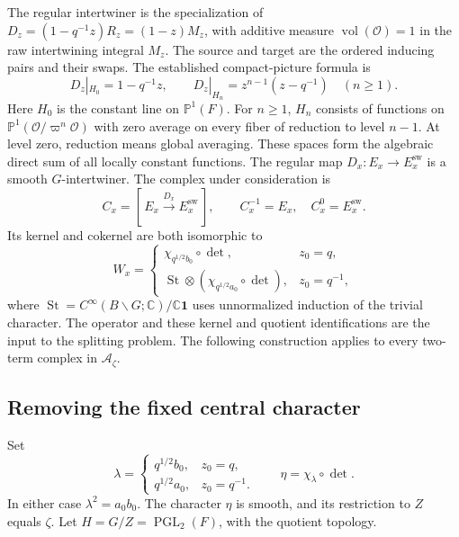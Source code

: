 The regular intertwiner is the specialization of
$D_z=(1-q^{-1}z)R_z=(1-z)M_z$, with additive measure
$\operatorname{vol}(\mathcal O)=1$ in the raw intertwining integral $M_z$.
The source and target are the ordered inducing pairs and their swaps.
The established compact-picture formula is
\[
 D_z|_{H_0}=1-q^{-1}z,\qquad
 D_z|_{H_n}=z^{n-1}(z-q^{-1})\quad(n\ge1).
\]
Here $H_0$ is the constant line on $\mathbb P^1(F)$.
For $n\ge1$, $H_n$ consists of functions on
$\mathbb P^1(\mathcal O/\varpi^n\mathcal O)$ with zero average on every fiber of reduction to level $n-1$.
At level zero, reduction means global averaging.
These spaces form the algebraic direct sum of all locally constant functions.
The regular map $D_x:E_x\to E_x^{\mathrm{sw}}$ is a smooth $G$-intertwiner.
The complex under consideration is
\begin{equation}\label{v4-arith:w10-d:fixed-center:eq:cone}
 C_x=[\,E_x\xrightarrow{D_x}E_x^{\mathrm{sw}}\,],
 \qquad C_x^{-1}=E_x,\quad C_x^0=E_x^{\mathrm{sw}}.
\end{equation}
Its kernel and cokernel are both isomorphic to
\begin{equation}\label{v4-arith:w10-d:fixed-center:eq:W}
 W_x=\begin{cases}
 \chi_{q^{1/2}b_0}\circ\det,&z_0=q,\\
 \operatorname{St}\otimes(\chi_{q^{1/2}a_0}\circ\det),&z_0=q^{-1},
 \end{cases}
\end{equation}
where $\operatorname{St}=C^\infty(B\backslash G;\mathbb C)/\mathbb C\mathbf1$ uses unnormalized induction of the trivial character.
The operator and these kernel and quotient identifications are the input to the splitting problem.
The following construction applies to every two-term complex in $\mathcal A_\zeta$.

\subsection{Removing the fixed central character}

Set
\[
 \lambda=\begin{cases}q^{1/2}b_0,&z_0=q,\\q^{1/2}a_0,&z_0=q^{-1}.
 \end{cases}
 \qquad \eta=\chi_\lambda\circ\det.
\]
In either case $\lambda^2=a_0b_0$.
The character $\eta$ is smooth, and its restriction to $Z$ equals $\zeta$.
Let $H=G/Z=\operatorname{PGL}_2(F)$, with the quotient topology.

